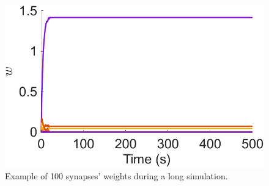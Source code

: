 \documentclass[utf8]{FrontiersinHarvard} %
\begin{document}
\begin{subfigure}
\begin{minipage}[b]{0.21\textwidth}
        \caption{}
        \label{figs:results:network_end}
    \end{minipage}%
\setcounter{figure}{2}
\setcounter{subfigure}{-1}
    \caption{Typical network dynamics. {\textbf{(A)}} Firing rates of the network's neurons. {\textbf{(B)}} Sorted firing rate of the network's neurons for when they first fire $\ge\SI{100}{\hertz}$. {\textbf{(C)}} Change in the firing rate from after learning to the end of the simulation. {\textbf{(D)}} Weights, $w$, after learning. {\textbf{(E)}} Left axis: Example of \SI{100}{} synapses' weights. Right axis/dashed line: Mean of nonfilopodia synapses' weights. {\textbf{(C)}} Distance between nonfilopodia spines. {\textbf{(D)}}  {\textbf{(E)}} Resource pools, $p$. {\textbf{(F)}} Mean in degree, out degree, in closeness, and out closeness during the simulation. {\textbf{(G)}} Network of neurons after learning. Only the strongest \SI{10}{\percent} are shown. Line width represents weight. {\textbf{(H)}} Weight change after learning. {\textbf{(I)}} Network of neurons at the end of the simulation.}
    \label{figs:results:typical}
\end{subfigure}

\begin{subfigure}
\setcounter{figure}{3}
\setcounter{subfigure}{0}
    \begin{minipage}[b]{0.32\textwidth}
        \includegraphics[width=\linewidth]{rbSTDP_long/weights_E2E_traces.pdf}
    \end{minipage}%

\setcounter{figure}{3}
\setcounter{subfigure}{-1}
    \caption{Example of \SI{100}{} synapses' weights during a long simulation.}
    \label{figs:results:long}
\end{subfigure}
\end{document}
